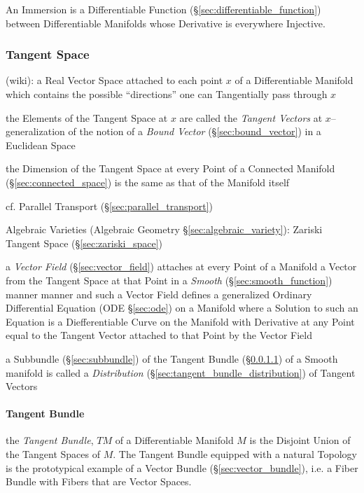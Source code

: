 An Immersion is a Differentiable Function
(\S\ref{sec:differentiable_function}) between Differentiable Manifolds
whose Derivative is everywhere Injective.



\subsubsection{Tangent Space}\label{sec:tangent_space}

(wiki): a Real Vector Space attached to each point $x$ of a Differentiable
Manifold which contains the possible ``directions'' one can Tangentially pass
through $x$

the Elements of the Tangent Space at $x$ are called the \emph{Tangent Vectors}
at $x$-- generalization of the notion of a \emph{Bound Vector}
(\S\ref{sec:bound_vector}) in a Euclidean Space

the Dimension of the Tangent Space at every Point of a Connected Manifold
(\S\ref{sec:connected_space}) is the same as that of the Manifold itself

\fist cf. Parallel Transport (\S\ref{sec:parallel_transport})

\fist Algebraic Varieties (Algebraic Geometry \S\ref{sec:algebraic_variety}):
Zariski Tangent Space (\S\ref{sec:zariski_space})

a \emph{Vector Field} (\S\ref{sec:vector_field}) attaches at every Point of a
Manifold a Vector from the Tangent Space at that Point in a \emph{Smooth}
(\S\ref{sec:smooth_function}) manner manner and such a Vector Field defines a
generalized Ordinary Differential Equation (ODE \S\ref{sec:ode}) on a Manifold
where a Solution to such an Equation is a Diefferentiable Curve on the Manifold
with Derivative at any Point equal to the Tangent Vector attached to that Point
by the Vector Field

a Subbundle (\S\ref{sec:subbundle}) of the Tangent Bundle
(\S\ref{sec:tangent_bundle}) of a Smooth manifold is called a
\emph{Distribution} (\S\ref{sec:tangent_bundle_distribution}) of Tangent
Vectors



\paragraph{Tangent Bundle}\label{sec:tangent_bundle}\hfill

the \emph{Tangent Bundle}, $T M$ of a Differentiable Manifold $M$ is the
Disjoint Union of the Tangent Spaces of $M$. The Tangent Bundle equipped with a
natural Topology is the prototypical example of a Vector Bundle
(\S\ref{sec:vector_bundle}), i.e. a Fiber Bundle with Fibers that are Vector
Spaces.

